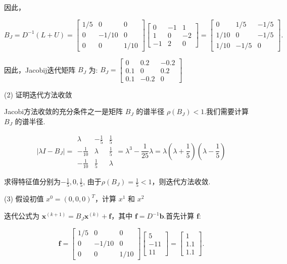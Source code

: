 \begin{tcolorbox}[enhanced,colback=10,colframe=9,breakable,coltitle=green!25!black,title=2024]
因此，

$$
B_J = D^{-1}(L+U) = \begin{bmatrix} 1/5 & 0 & 0 \\ 0 & -1/10 & 0 \\ 0 & 0 & 1/10 \end{bmatrix}\begin{bmatrix} 0 & -1 & 1 \\ 1 & 0 & -2 \\ -1 & 2 & 0 \end{bmatrix}= \begin{bmatrix} 0 & 1/5 & -1/5 \\ 1/10 & 0 & -1/5 \\ 1/10 & -1/5 & 0 \end{bmatrix}.
$$

因此，Jacobij迭代矩阵 $ B_{J} $ 为:
$
B_{J}=\left[\begin{array}{ccc}
0 & 0.2 & -0.2 \\
0.1 & 0 & 0.2 \\
0.1 & -0.2 & 0
\end{array}\right]
$

(2) 证明迭代方法收敛

Jacobi方法收敛的充分条件之一是矩阵 $B_J$ 的谱半径 $\rho(B_J) < 1$.我们需要计算 $B_J$ 的谱半径.

$$|\lambda I-B_J|= \begin{array}{|ccc|} \lambda & -\frac15 & \frac15 \\ -\frac{1}{10} & \lambda & \frac{1}{5} \\ -\frac{1}{10} &\frac{1}{5} & \lambda \end{array}=\lambda^3-\frac{1}{25}\lambda=\lambda(\lambda+\frac15)(\lambda-\frac15)$$

求得特征值分别为$-\frac 15,0,\frac15$, 由于$\rho(B_J)=\frac 15 < 1$，则迭代方法收敛.

 (3) 假设初值 $ x^{0}=(0,0,0)^{T}$，计算 $ x^{1} $ 和 $ x^{2} $

迭代公式为 $\boldsymbol{x}^{(k+1)} = B_J \boldsymbol{x}^{(k)} + \boldsymbol{f}$，其中 $\boldsymbol{f} = D^{-1} \boldsymbol{b}$.首先计算 $\boldsymbol{f}$:

$$
\boldsymbol{f} = \begin{bmatrix} 1/5 & 0 & 0 \\ 0 & -1/10 & 0 \\ 0 & 0 & 1/10 \end{bmatrix} \begin{bmatrix} 5 \\ -11 \\ 11 \end{bmatrix} = \begin{bmatrix} 1 \\ 1.1 \\ 1.1 \end{bmatrix}.
$$


\end{tcolorbox}
